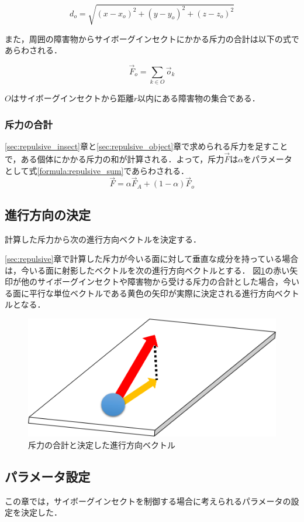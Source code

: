 \documentclass[a4paper,11pt]{jarticle}
\begin{document}
	\begin{equation}
	\label{formula:distance_object}
	d_o = \sqrt{(x-x_o)^2+(y-y_o)^2+(z-z_o)^2}	
	\end{equation}
	
	また，周囲の障害物からサイボーグインセクトにかかる斥力の合計は以下の式であらわされる．
	
	\begin{equation}
	\vec{F}_o =　\sum_{k \in O}\vec{o}_k
	\label{formula:repalsive_object}
	\end{equation}
	
	$O$はサイボーグインセクトから距離$r$以内にある障害物の集合である．
	
	\subsubsection{斥力の合計}
	\ref{sec:repulsive_insect}章と\ref{sec:repulsive_object}章で求められる斥力を足すことで，ある個体にかかる斥力の和が計算される．よって，斥力$\vec{F}$は$\alpha$をパラメータとして式\ref{formula:repulsive_sum}であらわされる．
	\begin{equation}
	\vec{F} = \alpha\vec{F}_A + (1 - \alpha)\vec{F}_o
	\label{formula:repulsive_sum}
	\end{equation}
	
	
	\subsection{進行方向の決定}
	\label{sec:decide}
	計算した斥力から次の進行方向ベクトルを決定する．
	
	\ref{sec:repulsive}章で計算した斥力が今いる面に対して垂直な成分を持っている場合は，今いる面に射影したベクトルを次の進行方向ベクトルとする．
	図\ref{fig:repulsive}の赤い矢印が他のサイボーグインセクトや障害物から受ける斥力の合計とした場合，今いる面に平行な単位ベクトルである黄色の矢印が実際に決定される進行方向ベクトルとなる．
	\begin{figure}
		\centering
		\includegraphics[width=0.35\linewidth]{png/repulsive.png}
		\caption[斥力の射影]{斥力の合計と決定した進行方向ベクトル}
		\label{fig:repulsive}
	\end{figure}
	
	\subsection{パラメータ設定}
	この章では，サイボーグインセクトを制御する場合に考えられるパラメータの設定を決定した．
	
\end{document}
